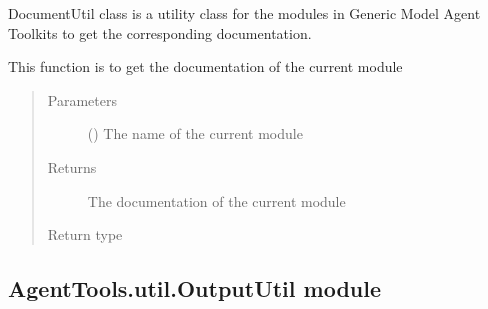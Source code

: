\documentclass[letterpaper,10pt,english]{sphinxmanual}
\begin{document}
\begin{fulllineitems}
\label{\detokenize{AgentTools.util:AgentTools.util.DocumentUtil.DocumentUtil}}
DocumentUtil class is a utility class for the modules in Generic Model Agent Toolkits to get the corresponding documentation.

\begin{fulllineitems}
\label{\detokenize{AgentTools.util:AgentTools.util.DocumentUtil.DocumentUtil.get_documentation}}
This function is to get the documentation of the current module
\begin{quote}\begin{description}
\item[{Parameters}] \leavevmode
{} () \textendash{} The name of the current module

\item[{Returns}] \leavevmode
The documentation of the current module

\item[{Return type}] \leavevmode
{}

\end{description}\end{quote}

\end{fulllineitems}


\end{fulllineitems}



\subsection{AgentTools.util.OutputUtil module}
\label{\detokenize{AgentTools.util:module-AgentTools.util.OutputUtil}}\label{\detokenize{AgentTools.util:agenttools-util-outpututil-module}}
\end{document}
